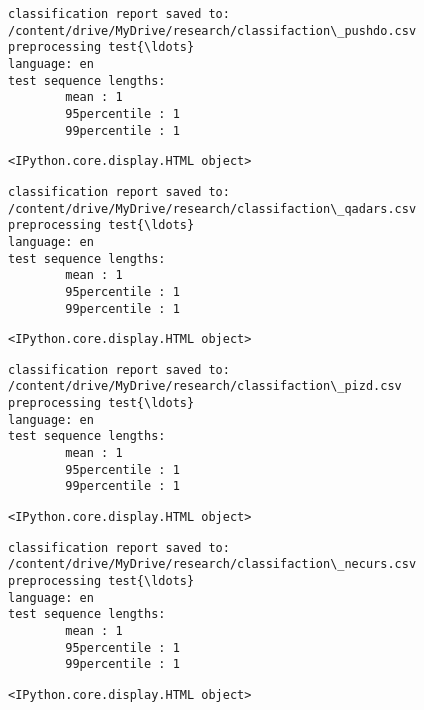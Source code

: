 \documentclass[11pt]{article}
\begin{document}
    
    \begin{Verbatim}[commandchars=\\\{\}]
classification report saved to:
/content/drive/MyDrive/research/classifaction\_pushdo.csv
preprocessing test{\ldots}
language: en
test sequence lengths:
        mean : 1
        95percentile : 1
        99percentile : 1
    \end{Verbatim}

    
    \begin{Verbatim}[commandchars=\\\{\}]
<IPython.core.display.HTML object>
    \end{Verbatim}

    
    \begin{Verbatim}[commandchars=\\\{\}]
classification report saved to:
/content/drive/MyDrive/research/classifaction\_qadars.csv
preprocessing test{\ldots}
language: en
test sequence lengths:
        mean : 1
        95percentile : 1
        99percentile : 1
    \end{Verbatim}

    
    \begin{Verbatim}[commandchars=\\\{\}]
<IPython.core.display.HTML object>
    \end{Verbatim}

    
    \begin{Verbatim}[commandchars=\\\{\}]
classification report saved to:
/content/drive/MyDrive/research/classifaction\_pizd.csv
preprocessing test{\ldots}
language: en
test sequence lengths:
        mean : 1
        95percentile : 1
        99percentile : 1
    \end{Verbatim}

    
    \begin{Verbatim}[commandchars=\\\{\}]
<IPython.core.display.HTML object>
    \end{Verbatim}

    
    \begin{Verbatim}[commandchars=\\\{\}]
classification report saved to:
/content/drive/MyDrive/research/classifaction\_necurs.csv
preprocessing test{\ldots}
language: en
test sequence lengths:
        mean : 1
        95percentile : 1
        99percentile : 1
    \end{Verbatim}

    
    \begin{Verbatim}[commandchars=\\\{\}]
<IPython.core.display.HTML object>
    \end{Verbatim}
\end{document}
